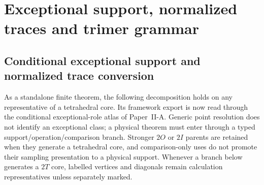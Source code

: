 \documentclass[12pt,a4paper]{article}
\begin{document}
\section{Exceptional support, normalized traces and trimer grammar}
\subsection{Conditional exceptional support and normalized trace conversion}

\label{p2e:subsec:trace-conversion}

As a standalone finite theorem, the following decomposition holds on any
representative of a tetrahedral core.  Its framework export is now read
through the conditional exceptional-role atlas of Paper~II-A.  Generic point
resolution does not identify an exceptional class; a physical theorem must
enter through a typed support/operation/comparison branch.  Stronger
\(2O\) or \(2I\) parents are retained when they generate a tetrahedral core,
and comparison-only uses do not promote their sampling presentation to a
physical support.  Whenever a branch below generates a \(2T\) core, labelled
vertices and diagonals remain calculation representatives unless separately
marked.
\end{document}
